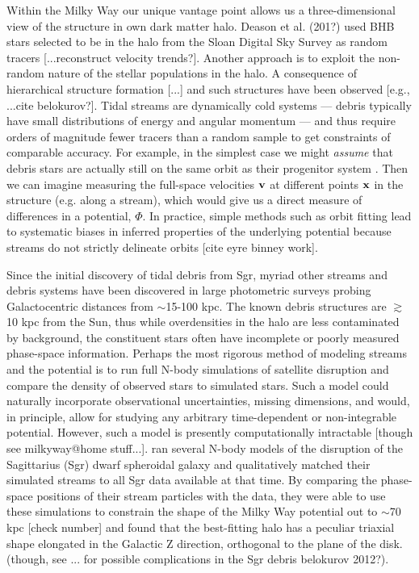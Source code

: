 \documentclass[letterpaper,12pt,preprint]{aastex}
\begin{document}
Within the Milky Way our unique vantage point allows us a three-dimensional view of the structure in own dark matter halo. Deason et al. (201?) used BHB stars selected to be in the halo from the Sloan Digital Sky Survey \cite[SDSS;][]{} as random tracers [...reconstruct velocity trends?]. Another approach is to exploit the non-random nature of the stellar populations in the halo. A consequence of hierarchical structure formation [...] and such structures have been observed [e.g., ...cite belokurov?]. Tidal streams are dynamically cold systems --- debris typically have small distributions of energy and angular momentum --- and thus require orders of magnitude fewer tracers than a random sample to get constraints of comparable accuracy. For example, in the simplest case we might {\it assume} that debris stars are actually still on the same orbit as their progenitor system \citep[a \emph{wrong} assumption, see e.g.][]{eyre}. Then we can imagine measuring the full-space velocities ${\bf v}$ at different points ${\bf x}$ in the structure (e.g. along a stream), which would give us a direct measure of differences in a potential, $\Phi$. In practice, simple methods such as orbit fitting lead to systematic biases in inferred properties of the underlying potential because streams do not strictly delineate orbits [cite eyre binney work]. 

Since the initial discovery of tidal debris from Sgr, myriad other streams and debris systems have been discovered in large photometric surveys probing Galactocentric distances from $\sim$15-100 kpc. The known debris structures are $\gtrsim$10 kpc from the Sun, thus while overdensities in the halo are less contaminated by background, the constituent stars often have incomplete or poorly measured phase-space information. Perhaps the most rigorous method of modeling streams and the potential is to run full N-body simulations of satellite disruption and compare the density of observed stars to simulated stars. Such a model could naturally incorporate observational uncertainties, missing dimensions, and would, in principle, allow for studying any arbitrary time-dependent or non-integrable potential. However, such a model is presently computationally intractable [though see milkyway@home stuff...]. \cite{law10} ran several N-body models of the disruption of the Sagittarius (Sgr) dwarf spheroidal galaxy and qualitatively matched their simulated streams to all Sgr data available at that time. By comparing the phase-space positions of their stream particles with the data, they were able to use these simulations to constrain the shape of the Milky Way potential out to $\sim$70 kpc [check number] and found that the best-fitting halo has a peculiar triaxial shape elongated in the Galactic Z direction, orthogonal to the plane of the disk. (though, see ... for possible complications in the Sgr debris belokurov 2012?). 
\end{document}
